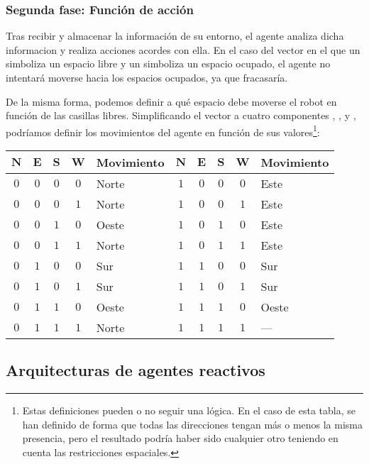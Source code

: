 \subsubsection{Segunda fase: Función de acción}

Tras recibir y almacenar la información de su entorno, el agente analiza dicha informacion y realiza acciones acordes con ella.
En el caso del vector en el que un  simboliza un espacio libre y un  simboliza un espacio ocupado, el agente no intentará moverse hacia los espacios ocupados, ya que fracasaría.

De la misma forma, podemos definir a qué espacio debe moverse el robot en función de las casillas libres.
Simplificando el vector a cuatro componentes , ,  y , podríamos definir los movimientos del agente en función de sus valores\footnote{Estas definiciones pueden o no seguir una lógica. En el caso de esta tabla, se han definido de forma que todas las direcciones tengan más o menos la misma presencia, pero el resultado podría haber sido cualquier otro teniendo en cuenta las restricciones espaciales.}:

\begin{center}
\begin{tabular}{c c c c l c c c c l}
$\boldsymbol{N}$ & $\boldsymbol{E}$ & $\boldsymbol{S}$ & $\boldsymbol{W}$ & \textbf{Movimiento} & $\boldsymbol{N}$ & $\boldsymbol{E}$ & $\boldsymbol{S}$ & $\boldsymbol{W}$ & \textbf{Movimiento} \\
\toprule
$0$ & $0$ & $0$ & $0$ & Norte & $1$ & $0$ & $0$ & $0$ & Este  \\
$0$ & $0$ & $0$ & $1$ & Norte & $1$ & $0$ & $0$ & $1$ & Este  \\
$0$ & $0$ & $1$ & $0$ & Oeste & $1$ & $0$ & $1$ & $0$ & Este  \\
$0$ & $0$ & $1$ & $1$ & Norte & $1$ & $0$ & $1$ & $1$ & Este  \\
$0$ & $1$ & $0$ & $0$ & Sur   & $1$ & $1$ & $0$ & $0$ & Sur   \\
$0$ & $1$ & $0$ & $1$ & Sur   & $1$ & $1$ & $0$ & $1$ & Sur   \\
$0$ & $1$ & $1$ & $0$ & Oeste & $1$ & $1$ & $1$ & $0$ & Oeste \\
$0$ & $1$ & $1$ & $1$ & Norte & $1$ & $1$ & $1$ & $1$ & ---   \\
\end{tabular}
\end{center}

\subsection{Arquitecturas de agentes reactivos}

